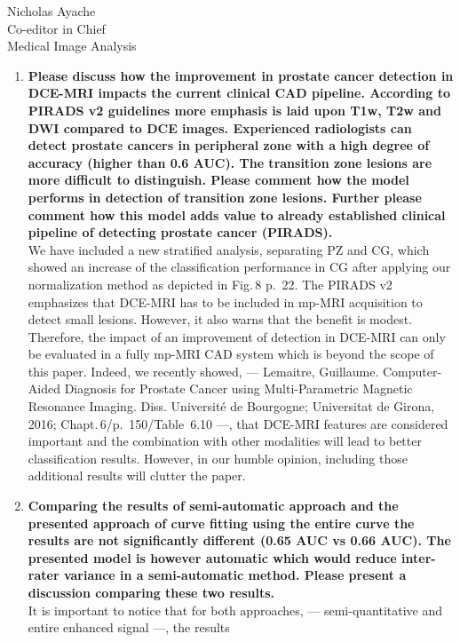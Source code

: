 \documentclass{letter}
\begin{document}
\begin{letter}{Nicholas Ayache \\ Co-editor in Chief \\ Medical Image Analysis}
\begin{enumerate}
    Subsequently, our approach should work on any type
    of devices, enabling multi-institutional studies. We included
    these remarks in our future work section in p.~23/l.~396.
  \item \textbf{Please discuss how the improvement in prostate cancer
      detection in DCE-MRI impacts the current clinical CAD
      pipeline. According to PIRADS v2 guidelines more emphasis is
      laid upon T1w, T2w and DWI compared to DCE images. Experienced
      radiologists can detect prostate cancers in peripheral zone with
      a high degree of accuracy (higher than 0.6 AUC). The transition
      zone lesions are more difficult to distinguish. Please comment
      how the model performs in detection of transition zone
      lesions. Further please comment how this model adds value to
      already established clinical pipeline of detecting prostate
      cancer (PIRADS).}\\
    We have included a new stratified analysis, separating PZ and CG,
    which showed an increase of the classification performance in CG after
    applying our
    normalization method as depicted in Fig.\,8 p.~22.
    The PIRADS v2 emphasizes that DCE-MRI has to be included in
    mp-MRI acquisition to detect small lesions. However, it also warns
    that the benefit is modest. Therefore, the impact of an
    improvement of detection in DCE-MRI can only be evaluated in a
    fully mp-MRI CAD system which is beyond the scope of this paper.
    Indeed, we recently showed, --- Lemaitre,
    Guillaume. Computer-Aided Diagnosis for Prostate Cancer using
    Multi-Parametric Magnetic Resonance Imaging. Diss. Universit\'e de
    Bourgogne; Universitat de Girona, 2016;
    Chapt.\,6/p.~150/Table~6.10 ---, that DCE-MRI features are
    considered important and the combination with other modalities
    will lead to better classification results.
    However, in our humble opinion, including those additional results
    will clutter the paper.
  \item \textbf{Comparing the results of semi-automatic approach and
      the presented approach of curve fitting using the entire curve
      the results are not significantly different (0.65 AUC vs 0.66
      AUC). The presented model is however automatic which would
      reduce inter-rater variance in a semi-automatic method. Please
      present a discussion comparing these two results.}\\
    It is important to notice that for both approaches, ---
    semi-quantitative and entire enhanced signal ---, the results

\end{enumerate}
\end{letter}
\end{document}
